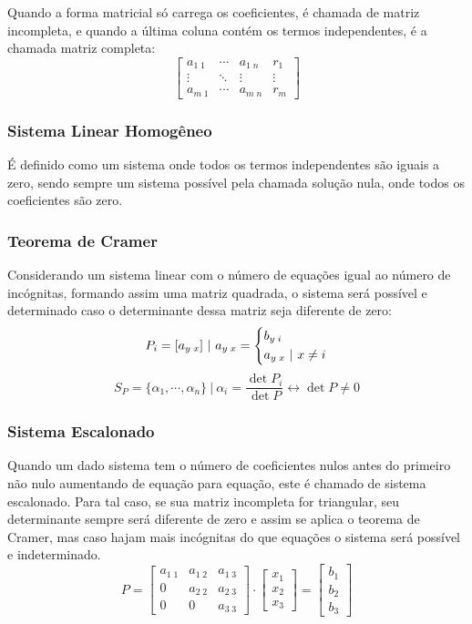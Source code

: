         Quando a forma matricial só carrega os coeficientes, é chamada de matriz incompleta, e quando a última coluna contém os termos independentes, é a chamada matriz completa:
        \[ \begin{bmatrix} a_{1 \; 1} & \cdots & a_{1 \; n} & r_1 \\ \vdots & \ddots & \vdots & \vdots \\ a_{m \; 1} & \cdots & a_{m \; n} & r_m \end{bmatrix} \]
    \subsubsection{Sistema Linear Homogêneo}
        É definido como um sistema onde todos os termos independentes são iguais a zero, sendo sempre um sistema possível pela chamada solução nula, onde todos os coeficientes são zero.
    \subsubsection{Teorema de Cramer}
        Considerando um sistema linear com o número de equações igual ao número de incógnitas, formando assim uma matriz quadrada, o sistema será possível e determinado caso o determinante dessa matriz seja diferente de zero:
        \[ P_i = [a_{y \; x}] \ | \ a_{y \; x} = \begin{dcases} b_{y \; i} \\ a_{y \; x} \ | \ x \neq i \end{dcases} \]
        \[ S_P = \{ \alpha_1, \cdots, \alpha_n \} \ | \ \alpha_i = \frac{\det{P_i}}{\det{P}} \leftrightarrow \det{P} \neq 0 \]
    \subsubsection{Sistema Escalonado}
        Quando um dado sistema tem o número de coeficientes nulos antes do primeiro não nulo aumentando de equação para equação, este é chamado de sistema escalonado. Para tal caso, se sua matriz incompleta for triangular, seu determinante sempre será diferente de zero e assim se aplica o teorema de Cramer, mas caso hajam mais incógnitas do que equações o sistema será possível e indeterminado. \eg
        \[ P = \begin{bmatrix} a_{1 \; 1} & a_{1 \; 2} & a_{1 \; 3} \\ 0 & a_{2 \; 2} & a_{2 \; 3} \\ 0 & 0 & a_{3 \; 3} \end{bmatrix} \cdot \begin{bmatrix} x_1 \\ x_2 \\ x_3 \end{bmatrix} = \begin{bmatrix} b_1 \\ b_2 \\ b_3 \end{bmatrix} \]
